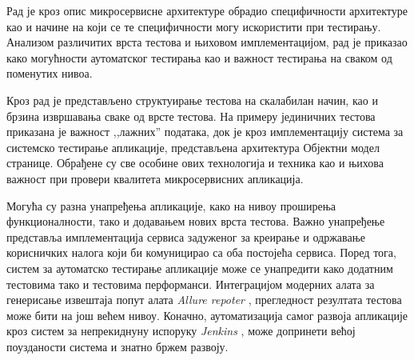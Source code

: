 \documentclass[12pt,oneside]{memoir}
\begin{document}
Рад је кроз опис микросервисне архитектуре обрадио специфичности архитектуре као и начине на који се те специфичности могу искористити при тестирању. Анализом различитих врста тестова и њиховом имплементацијом, рад је приказао како могућности аутоматског тестирања као и важност тестирања на сваком од поменутих нивоа. 

Кроз рад је представљено структуирање тестова на скалабилан начин, као и брзина извршавања сваке од врсте тестова. На примеру јединичних тестова приказана је важност ,,лажних” података, док је кроз имплементацију система за системско тестирање апликације, представљена архитектура Објектни модел странице. Обрађене су све особине ових технологија и техника као и њихова важност при провери квалитета микросервисних апликација.

Могућа су разна унапређења апликације, како на нивоу проширења функционалности, тако и додавањем нових врста тестова. Важно унапређење представља имплементација сервиса задуженог за креирање и одржавање корисничких налога који би комуницирао са оба постојећа сервиса. Поред тога, систем за аутоматско тестирање апликације може се унапредити како додатним тестовима тако и тестовима перформанси. Интеграцијом модерних алата за генерисање извештаја попут алата \textit{Allure repoter} \cite{allure}, прегледност резултата тестова може бити на још већем нивоу. Коначно, аутоматизација самог развоја апликације кроз систем за непрекиднуну испоруку \textit{Jenkins} \cite{jenkins}, може допринети већој поузданости система и знатно бржем развоју.

\literatura

\backmatter
\end{document}
